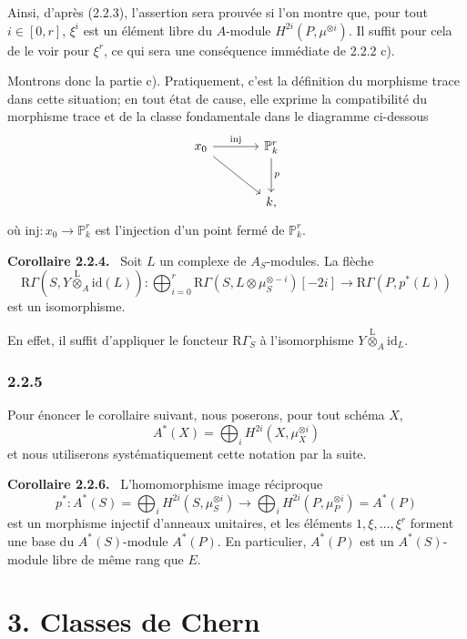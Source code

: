 \documentclass[11pt]{article}
\newenvironment{statement}[1]{\par\medskip\noindent\textbf{#1.}\ }{\par\medskip}
\providecommand{\lten}{\overset{\mathrm L}{\otimes}}
\providecommand{\lten}{\overset{\mathrm L}{\otimes}}
\providecommand{\lten}{\overset{\mathrm L}{\otimes}}
\providecommand{\lten}{\overset{\mathrm L}{\otimes}}
\providecommand{\lten}{\overset{\mathrm L}{\otimes}}
\begin{document}
Ainsi, d'après (2.2.3), l'assertion sera prouvée si l'on montre que, pour tout $i\in[0,r]$, $\xi^i$ est un élément libre du $A$-module $H^{2i}(P,\mu^{\otimes i})$. Il suffit pour cela de le voir pour $\xi^r$, ce qui sera une conséquence immédiate de 2.2.2 c).

Montrons donc la partie c). Pratiquement, c'est la définition du morphisme trace dans cette situation; en tout état de cause, elle exprime la compatibilité du morphisme trace et de la classe fondamentale dans le diagramme ci-dessous
\[
\begin{tikzcd}[column sep=large,row sep=large]
x_0 \arrow[r,"\mathrm{inj}"] \arrow[dr] & \mathbb P^r_k \arrow[d,"p"]\\
& k ,
\end{tikzcd}
\]
où $\mathrm{inj}:x_0\to \mathbb P^r_k$ est l'injection d'un point fermé de $\mathbb P^r_k$.

\begin{statement}{Corollaire 2.2.4}
Soit $L$ un complexe de $A_S$-modules. La flèche
\[
\mathrm R\Gamma(S,Y\lten_A\mathrm{id}(L)):
\bigoplus_{i=0}^r \mathrm R\Gamma(S,L\otimes\mu_S^{\otimes -i})[-2i]
\longrightarrow
\mathrm R\Gamma(P,p^*(L))
\]
est un isomorphisme.
\end{statement}

En effet, il suffit d'appliquer le foncteur $\mathrm R\Gamma_S$ à l'isomorphisme $Y\lten_A\mathrm{id}_L$.

\subsubsection*{2.2.5}
Pour énoncer le corollaire suivant, nous poserons, pour tout schéma $X$,
\[
A^*(X)=\bigoplus_i H^{2i}(X,\mu_X^{\otimes i})
\]
et nous utiliserons systématiquement cette notation par la suite.

\begin{statement}{Corollaire 2.2.6}
L'homomorphisme image réciproque
\[
p^*:A^*(S)=\bigoplus_i H^{2i}(S,\mu_S^{\otimes i})
\longrightarrow
\bigoplus_i H^{2i}(P,\mu_P^{\otimes i})=A^*(P)
\]
est un morphisme injectif d'anneaux unitaires, et les éléments $1,\xi,\ldots,\xi^r$ forment une base du $A^*(S)$-module $A^*(P)$. En particulier, $A^*(P)$ est un $A^*(S)$-module libre de même rang que $E$.
\end{statement}

\section*{3. Classes de Chern}
\end{document}

